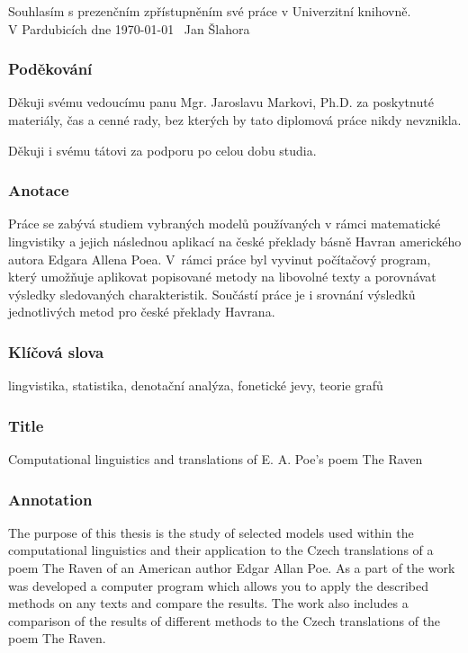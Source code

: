 \documentclass[11pt,a4paper,fleqn,titlepage,twoside,openany,export]{book}
\begin{document}
Souhlasím s prezenčním zpřístupněním své práce v Univerzitní knihovně.\\[4cm]
V Pardubicích dne \today\ \hfill{} Jan Šlahora

\newpage 
\thispagestyle{empty}
\subsubsection*{Poděkování}

Děkuji svému vedoucímu panu Mgr. Jaroslavu Markovi, Ph.D. za poskytnuté materiály, čas a cenné rady, bez kterých by tato diplomová práce nikdy nevznikla.

Děkuji i svému tátovi za podporu po celou dobu studia.

\newpage 
\thispagestyle{empty}
\subsubsection*{Anotace}
Práce se zabývá studiem vybraných modelů používaných v rámci matematické lingvistiky a jejich následnou aplikací na české překlady básně Havran amerického autora Edgara Allena Poea. V~rámci práce byl vyvinut počítačový program, který umožňuje aplikovat popisované metody na libovolné texty a porovnávat výsledky sledovaných charakteristik. Součástí práce je i srovnání výsledků jednotlivých metod pro české překlady Havrana.

\vspace*{0.8cm}\subsubsection*{Klíčová slova} 	 	 		

lingvistika, statistika, denotační analýza, fonetické jevy, teorie grafů

\vspace*{2.8cm}\subsubsection*{Title}
Computational linguistics and translations of E. A. Poe's poem The Raven

\vspace*{0.8cm}\subsubsection*{Annotation}

The purpose of this thesis is the study of selected models used within the computational \mbox{linguistics} and their application to the Czech translations of a poem The Raven of an American author Edgar Allan Poe. As a part of the work was developed a computer program which allows you to apply the described methods on any texts and compare the results. The work also includes a comparison of the results of different methods to the Czech translations of the poem The Raven.
\end{document}
